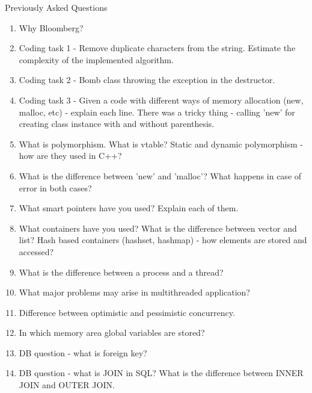 \documentclass[a4paper, 10pt]{article}
\begin{document}
Previously Asked Questions
\begin{enumerate}
\item Why Bloomberg?
\item Coding task 1 - Remove duplicate characters from the string. Estimate the complexity of the implemented algorithm.
\item Coding task 2 - Bomb class throwing the exception in the destructor.
\item Coding task 3 - Given  a code with different ways of memory allocation (new, malloc, etc) - explain each line. There was a tricky thing - calling 'new' for creating class instance with and without parenthesis.
\item What is polymorphism. What is vtable? Static and dynamic polymorphism - how are they used in C++?
\item What is the difference between 'new' and 'malloc'? What happens in case of error in both cases?
\item What smart pointers have you used? Explain each of them.
\item What containers have you used? What is the difference between vector and list? Hash based containers (hashset, hashmap) - how elements are stored and accessed?
\item What is the difference between a process and a thread?
\item What major problems may arise in multithreaded application?
\item Difference between optimistic and pessimistic concurrency.
\item In which memory area global variables are stored?
\item DB question - what is foreign key?
\item DB question - what is JOIN in SQL? What is the difference between INNER JOIN and OUTER JOIN.
\end{enumerate}
\end{document}

